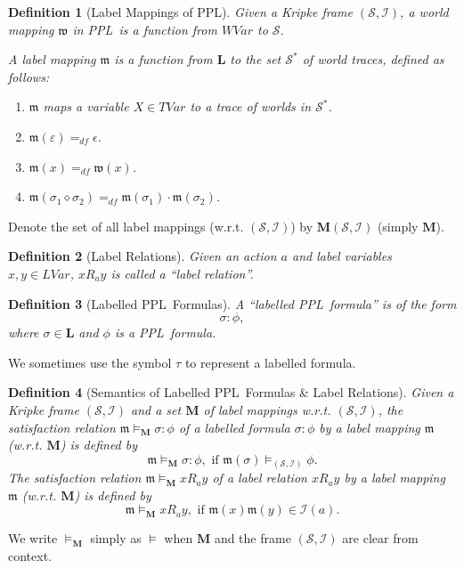 \documentclass[manuscript,screen]{acmart}
\newtheorem{definition}{Definition}[section]
\newcommand{\bff}[1]{\mathbf{#1}}
\newcommand{\mcl}[1]{\mathcal{#1}}
\newcommand{\mfr}[1]{\mathfrak{#1}}
\newcommand{\dddef}[0]{=_{df}}
\newcommand{\Conf}[0]{\bff{L}}
\newcommand{\lm}[0]{\mfr{m}}
\newcommand{\cat}[0]{\diamond}
\newcommand{\Wd}[0]{\mcl{S}}
\newcommand{\I}[0]{\mcl{I}}
\newcommand{\LM}[0]{\bff{M}}
\newcommand{\LVar}[0]{\mathit{LVar}}
\newcommand{\WVar}[0]{\textit{WVar}}
\newcommand{\TVar}[0]{\textit{TVar}}
\newcommand{\wm}[0]{\mfr{w}}
\newcommand{\PPL}[0]{\mbox{PPL}}
\begin{document}
\begin{definition}[Label Mappings of \PPL]
Given a Kripke frame $(\Wd, \I)$, 
a world mapping $\wm$ in \PPL\ is a function from $\WVar$ to $\Wd$. 

A label mapping $\lm$ is a function from $\Conf$ to the set $\Wd^*$ of world traces, defined as follows:
\begin{enumerate}[i]
\item $\lm$ maps a variable $X\in\TVar$ to a trace of worlds in $\Wd^*$.
\item $\lm(\varepsilon)\dddef \epsilon$.
\item $\lm(x)\dddef \wm(x)$.
\item $\lm(\sigma_1\cat \sigma_2)\dddef \lm(\sigma_1)\cdot\lm(\sigma_2)$.
\end{enumerate} 
\end{definition}

Denote the set of all label mappings (w.r.t. $(\Wd, \I)$) by $\LM(\Wd, \I)$ (simply $\LM$). 

\begin{definition}[Label Relations]
Given an action $a$ and label variables $x, y\in \LVar$, $x R_a y$ is called a ``label relation''.
\end{definition}

\begin{definition}[Labelled \PPL\ Formulas]
\label{def:Labelled PPL Formulas}
A ``labelled \PPL\ formula'' is of the form $$\sigma : \phi,$$ where $\sigma\in \Conf$ and $\phi$ is a \PPL\ formula. 
\end{definition}

We sometimes use the symbol $\tau$ to represent a labelled formula. 

\begin{definition}[Semantics of Labelled \PPL\ Formulas \& Label Relations]
    \label{def:semantics of labelled PPL formulas and label relations}
Given a Kripke frame $(\Wd, \I)$ and a set $\LM$ of label mappings w.r.t. $(\Wd, \I)$, the satisfaction relation $\lm\models_{\LM} \sigma:\phi$ of a labelled formula $\sigma:\phi$ by a label mapping $\lm$ (w.r.t. $\LM$) is defined by 
   $$
   \lm\models_{\LM} \sigma:\phi, \mbox{ if }\lm(\sigma) \models_{(\Wd, \I)} \phi. 
   $$
The satisfaction relation $\lm\models_{\LM}xR_a y$ of a label relation $xR_a y$ by a label mapping $\lm$ (w.r.t. $\LM$) is defined by 
   $$
    \lm\models_{\LM}xR_a y, \mbox{ if }\lm(x)\lm(y)\in \I(a). 
   $$
\end{definition}
We write $\models_{\LM}$ simply as $\models$ when $\LM$ and the frame $(\Wd, \I)$ are clear from context. 
\end{document}
